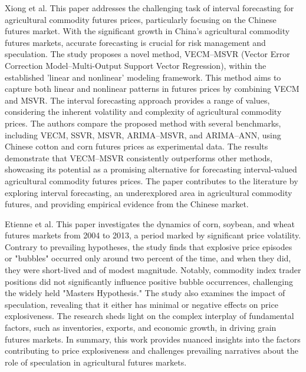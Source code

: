         Xiong et al. \cite{xiong2015} This paper addresses the challenging task of interval forecasting for agricultural commodity futures prices, particularly focusing on the Chinese futures market. With the significant growth in China's agricultural commodity futures markets, accurate forecasting is crucial for risk management and speculation. The study proposes a novel method, VECM–MSVR (Vector Error Correction Model–Multi-Output Support Vector Regression), within the established 'linear and nonlinear' modeling framework. This method aims to capture both linear and nonlinear patterns in futures prices by combining VECM and MSVR. The interval forecasting approach provides a range of values, considering the inherent volatility and complexity of agricultural commodity prices. The authors compare the proposed method with several benchmarks, including VECM, SSVR, MSVR, ARIMA–MSVR, and ARIMA–ANN, using Chinese cotton and corn futures prices as experimental data. The results demonstrate that VECM–MSVR consistently outperforms other methods, showcasing its potential as a promising alternative for forecasting interval-valued agricultural commodity futures prices. The paper contributes to the literature by exploring interval forecasting, an underexplored area in agricultural commodity futures, and providing empirical evidence from the Chinese market.
        
        Etienne et al. \cite{etienne2015} This paper investigates the dynamics of corn, soybean, and wheat futures markets from 2004 to 2013, a period marked by significant price volatility. Contrary to prevailing hypotheses, the study finds that explosive price episodes or "bubbles" occurred only around two percent of the time, and when they did, they were short-lived and of modest magnitude. Notably, commodity index trader positions did not significantly influence positive bubble occurrences, challenging the widely held "Masters Hypothesis." The study also examines the impact of speculation, revealing that it either has minimal or negative effects on price explosiveness. The research sheds light on the complex interplay of fundamental factors, such as inventories, exports, and economic growth, in driving grain futures markets. In summary, this work provides nuanced insights into the factors contributing to price explosiveness and challenges prevailing narratives about the role of speculation in agricultural futures markets.

